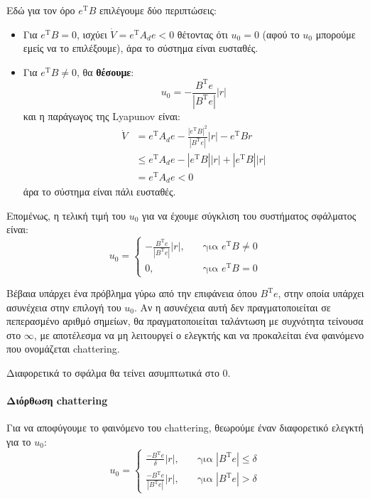 \documentclass[11pt,a4paper,notitlepage,fleqn]{article}
\begin{document}
Εδώ για τον όρο \( e^{\mathrm T} B \) επιλέγουμε δύο περιπτώσεις:
\begin{itemize}
	\item Για \( e^{\mathrm T} B = 0 \), ισχύει \( \dot V = e^{\mathrm T} A_d e< 0 \) θέτοντας ότι \( u_0 = 0 \) (αφού το \( u_0 \) μπορούμε εμείς να το επιλέξουμε), άρα το σύστημα είναι ευσταθές.
	\item Για \( e^{\mathrm T} B \neq 0 \), θα \textbf{θέσουμε}:
	\[
	u_0 = -\frac{B^{\mathrm T} e}{\left| B^{\mathrm T} e \right|}|r|
	\]
	και η παράγωγος της Lyapunov είναι:
	\begin{align*}
		\dot V &= e^{\mathrm T} A_d e -\frac{\left|e^{\mathrm T}B\right|^2}{\left|B^{\mathrm T}e\right|}|r| - e^{\mathrm T} B r
		\\ &\leq e^{\mathrm T}A_d e - \left| e^{\mathrm T}B \right||r|
		+ \left| e^{\mathrm T} B \right| |r|
		\\ &= e^{\mathrm T} A_d e < 0
	\end{align*}
	άρα το σύστημα είναι πάλι ευσταθές.
\end{itemize}

Επομένως, η τελική τιμή του \( u_0 \) για να έχουμε σύγκλιση του
συστήματος σφάλματος είναι:
\[
u_0 = \begin{cases}
-\frac{B^{\mathrm T}e}{\left| B^{\mathrm T}e \right|}|r|,
&\quad \text{για } e^{\mathrm T} B \neq 0 \\
0,&\quad \text{για } e^{\mathrm T} B = 0
\end{cases}
\]

Βέβαια υπάρχει ένα πρόβλημα γύρω από την επιφάνεια όπου
\( B^{\mathrm T}e \), στην οποία υπάρχει ασυνέχεια στην επιλογή του
\( u_0 \). Αν η ασυνέχεια αυτή δεν πραγματοποιείται σε πεπερασμένο
αριθμό σημείων, θα πραγματοποιείται ταλάντωση με συχνότητα τείνουσα στο
\( \infty \), με αποτέλεσμα να μη λειτουργεί ο ελεγκτής και να προκαλείται ένα φαινόμενο που ονομάζεται chattering.

Διαφορετικά το σφάλμα θα τείνει ασυμπτωτικά στο 0.

\paragraph{Διόρθωση chattering}
Για να αποφύγουμε το φαινόμενο του chattering, θεωρούμε έναν διαφορετικό
ελεγκτή για το \( u_0 \):
\[
u_0 = \begin{cases}
\frac{-B^{\mathrm T}e}{\delta}|r|, &\quad \text{για } \left|B^{\mathrm T} e\right| \leq \delta\\
\frac{-B^{\mathrm T} e}{\left| B^{\mathrm T} e \right|}|r|, &\quad \text{για } \left| B^{\mathrm T}e \right| > \delta
\end{cases}
\]
\end{document}
